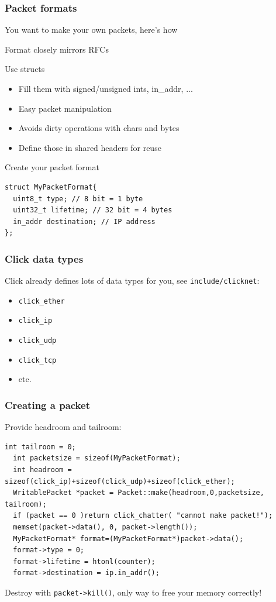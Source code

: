 \documentclass{beamer}
\begin{document}
\begin{frame}[fragile]
\frametitle{Packet formats}
You want to make your own packets, here's how

Format closely mirrors RFCs

Use structs
\begin{itemize}
	\item Fill them with signed/unsigned ints, in\_addr, ...
	\item Easy packet manipulation
	\item Avoids dirty operations with chars and bytes
	\item Define those in shared headers for reuse
\end{itemize}
Create your packet format
\begin{lstlisting}[basicstyle=\footnotesize]
struct MyPacketFormat{
  uint8_t type; // 8 bit = 1 byte
  uint32_t lifetime; // 32 bit = 4 bytes
  in_addr destination; // IP address
};
\end{lstlisting}
\end{frame}

\begin{frame}[fragile]
\frametitle{Click data types}
Click already defines lots of data types for you, see \lstinline!include/clicknet!:
\begin{itemize}
	\item \lstinline!click_ether!
	\item \lstinline!click_ip   !
	\item \lstinline!click_udp  !
	\item \lstinline!click_tcp  !
	\item etc. 
\end{itemize}
\end{frame}

\begin{frame}[fragile]
\frametitle{Creating a packet}
Provide headroom and tailroom:
\begin{lstlisting}[basicstyle=\footnotesize]
  int tailroom = 0;
  int packetsize = sizeof(MyPacketFormat);
  int headroom = sizeof(click_ip)+sizeof(click_udp)+sizeof(click_ether);
  WritablePacket *packet = Packet::make(headroom,0,packetsize, tailroom);
  if (packet == 0 )return click_chatter( "cannot make packet!");
  memset(packet->data(), 0, packet->length());
  MyPacketFormat* format=(MyPacketFormat*)packet->data();
  format->type = 0;
  format->lifetime = htonl(counter);
  format->destination = ip.in_addr();
\end{lstlisting}
Destroy with \lstinline!packet->kill()!, only way to free your memory correctly!
\end{frame}
\end{document}
